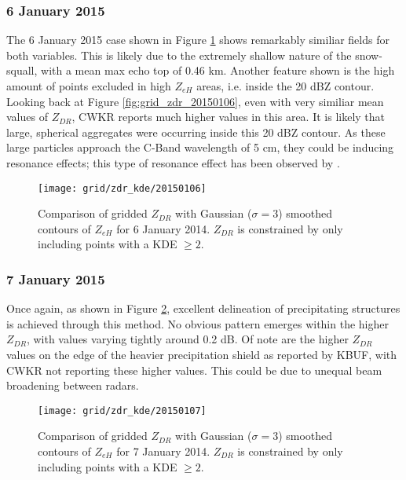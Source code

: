 \subsubsection{6 January 2015}
The 6 January 2015 case shown in Figure \ref{fig:grid_zdr_kde_20150106} shows remarkably similiar fields for both variables. This is likely due to the extremely shallow nature of the snow-squall, with a mean max echo top of 0.46 km. Another feature shown is the high amount of points excluded in high $Z_{eH}$ areas,  i.e. inside the 20 dBZ contour. Looking back at Figure \ref{fig:grid_zdr_20150106}, even with very similiar mean values of $Z_{DR}$, CWKR reports much higher values in this area. It is likely that large, spherical aggregates were occurring inside this 20 dBZ contour. As these large particles approach the C-Band wavelength of 5 cm, they could be inducing resonance effects; this type of resonance effect has been observed by \citet{Hassan2017}.
\begin{figure}[H]
\texttt{[image: grid/zdr\_kde/20150106]}
\caption{Comparison of gridded $Z_{DR}$ with Gaussian ($\sigma=3$) smoothed contours of $Z_{eH}$ for 6 January 2014. $Z_{DR}$ is constrained by only including points with a
KDE $\geq 2$.} 
\label{fig:grid_zdr_kde_20150106}
\end{figure}
\subsubsection{7 January 2015}
Once again, as shown in Figure \ref{fig:grid_zdr_kde_20150107}, excellent delineation of precipitating structures is achieved through this method. No obvious pattern emerges within the higher $Z_{DR}$, with values varying tightly around 0.2 dB. Of note are the higher $Z_{DR}$ values on the edge of the heavier precipitation shield as reported by KBUF, with CWKR not reporting these higher values. This could be due to unequal beam broadening between radars.
\begin{figure}[H]
\texttt{[image: grid/zdr\_kde/20150107]}
\caption{Comparison of gridded $Z_{DR}$ with Gaussian ($\sigma=3$) smoothed contours of $Z_{eH}$ for 7 January 2014. $Z_{DR}$ is constrained by only including points with a
KDE $\geq 2$.} 
\label{fig:grid_zdr_kde_20150107}
\end{figure}

